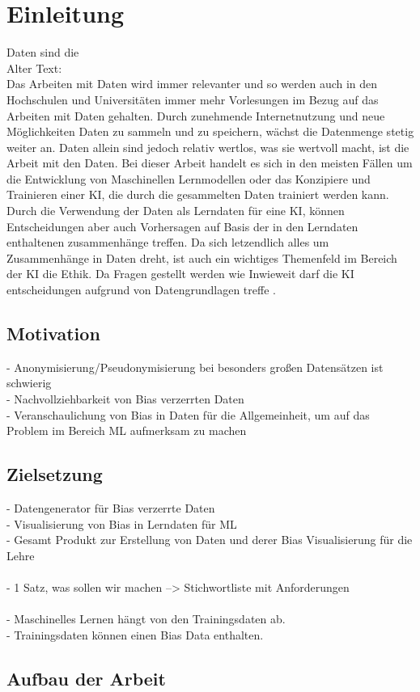 \chapter{Einleitung}
    \label{sec:einleitung}
    Daten sind die 
    \\
    Alter Text:
    \\
    Das Arbeiten mit Daten wird immer relevanter und so werden auch in den Hochschulen und Universitäten immer mehr Vorlesungen im Bezug auf das Arbeiten mit Daten gehalten. Durch zunehmende Internetnutzung und neue Möglichkeiten Daten zu sammeln und zu speichern, wächst die Datenmenge stetig weiter an. Daten allein sind jedoch relativ wertlos, was sie wertvoll macht, ist die Arbeit mit den Daten. Bei dieser Arbeit handelt es sich in den meisten Fällen um die Entwicklung von Maschinellen Lernmodellen oder das Konzipiere und Trainieren einer \ac{KI}, die durch die gesammelten Daten trainiert werden kann. Durch die Verwendung der Daten als Lerndaten für eine \ac{KI}, können Entscheidungen aber auch Vorhersagen auf Basis der in den Lerndaten enthaltenen zusammenhänge treffen. Da sich letzendlich alles um Zusammenhänge in Daten dreht, ist auch ein wichtiges Themenfeld im Bereich der \ac{KI} die Ethik. Da Fragen gestellt werden wie \dq Inwieweit darf die \ac{KI} entscheidungen aufgrund von Datengrundlagen treffe \dq. \cite{dullien2018}

    \section{Motivation}
    \label{subsec:motivation}

    -	Anonymisierung/Pseudonymisierung bei besonders gro{\ss}en Datensätzen ist schwierig \\
    -	Nachvollziehbarkeit von Bias verzerrten Daten \\
    -	Veranschaulichung von Bias in Daten für die Allgemeinheit, um auf das Problem im Bereich ML aufmerksam zu machen 

    \section{Zielsetzung}
    \label{subsec:zielsetzung}
    -	Datengenerator für Bias verzerrte Daten \\
    -	Visualisierung von Bias in Lerndaten für ML \\
    -	Gesamt Produkt zur Erstellung von Daten und derer Bias Visualisierung für die Lehre \\
    \\
    -   1 Satz, was sollen wir machen --> Stichwortliste mit Anforderungen \\
    \\
    -   Maschinelles Lernen hängt von den Trainingsdaten ab.\\
    -   Trainingsdaten können einen Bias Data enthalten.\\

    \section{Aufbau der Arbeit}
    \label{subsec:aufbau der arbeit}


    \newpage